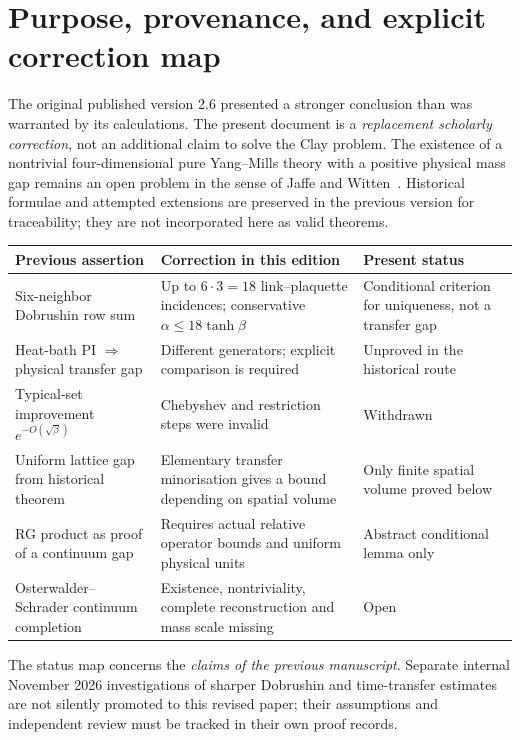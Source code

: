\documentclass[11pt,a4paper]{article}
\theoremstyle{remark}
\begin{document}
\section{Purpose, provenance, and explicit correction map}
The original published version 2.6 presented a stronger conclusion
than was warranted by its calculations. The present document is a
\emph{replacement scholarly correction}, not an additional claim to
solve the Clay problem. The existence of a nontrivial four-dimensional
pure Yang--Mills theory with a positive physical mass gap remains an
open problem in the sense of Jaffe and Witten~\cite{JaffeWitten}.
Historical formulae and attempted extensions are preserved in the
previous version for traceability; they are not incorporated here as
valid theorems.
\begin{center}\small
\begin{tabularx}{\textwidth}{@{}p{}YY@{}}
\toprule
Previous assertion & Correction in this edition & Present status\\
\midrule
Six-neighbor Dobrushin row sum & Up to $6\cdot3=18$ link--plaquette incidences; conservative $\alpha\le18\tanh\beta$ & Conditional criterion for uniqueness, not a transfer gap\\
Heat-bath PI $\Rightarrow$ physical transfer gap & Different generators; explicit comparison is required & Unproved in the historical route\\
Typical-set improvement $e^{-O(\sqrt\beta)}$ & Chebyshev and restriction steps were invalid & Withdrawn\\
Uniform lattice gap from historical theorem & Elementary transfer minorisation gives a bound depending on spatial volume & Only finite spatial volume proved below\\
RG product as proof of a continuum gap & Requires actual relative operator bounds and uniform physical units & Abstract conditional lemma only\\
Osterwalder--Schrader continuum completion & Existence, nontriviality, complete reconstruction and mass scale missing & Open\\
\bottomrule
\end{tabularx}
\end{center}
The status map concerns the \emph{claims of the previous manuscript}.
Separate internal November 2026 investigations of sharper Dobrushin and
time-transfer estimates are not silently promoted to this revised
paper; their assumptions and independent review must be tracked in
their own proof records.
\end{document}
